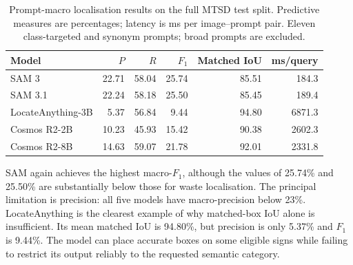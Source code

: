 \begin{table}[htbp]
\centering
\small
\caption{Prompt-macro localisation results on the full \gls{MTSD} test split. Predictive measures are percentages; latency is ms per image--prompt pair. Eleven class-targeted and synonym prompts; broad prompts are excluded.}
\label{tab:ev-mtsd-prompt-macro}
\renewcommand{\arraystretch}{1.15}
\begin{tabularx}{\textwidth}{@{}>{\raggedright\arraybackslash}Xrrrrr@{}}
\toprule
Model & $P$ & $R$ & $F_1$ & Matched \gls{IoU} & ms/query \\
\midrule
SAM 3 & 22.71 & 58.04 & 25.74 & 85.51 & 184.3 \\
SAM 3.1 & 22.24 & 58.18 & 25.50 & 85.45 & 189.4 \\
LocateAnything-3B & 5.37 & 56.84 & 9.44 & 94.80 & 6871.3 \\
Cosmos R2-2B & 10.23 & 45.93 & 15.42 & 90.38 & 2602.3 \\
Cosmos R2-8B & 14.63 & 59.07 & 21.78 & 92.01 & 2331.8 \\
\bottomrule
\end{tabularx}
\end{table}


SAM again achieves the highest macro-\(F_1\), although the values of 25.74\% and 25.50\% are substantially below those for waste localisation. The principal limitation is precision: all five models have macro-precision below 23\%. LocateAnything is the clearest example of why matched-box \gls{IoU} alone is insufficient. Its mean matched \gls{IoU} is 94.80\%, but precision is only 5.37\% and \(F_1\) is 9.44\%. The model can place accurate boxes on some eligible signs while failing to restrict its output reliably to the requested semantic category.

